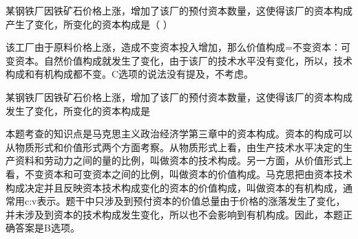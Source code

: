 \question 某钢铁厂因铁矿石价格上涨，增加了该厂的预付资本数量，这使得该厂的资本构成产生了变化，所变化的资本构成是（
）
\par{}
\begin{solution}该工厂由于原料价格上涨，造成不变资本投入增加，那么价值构成=不变资本：可变资本。自然价值构成就发生了变化，由于该厂的技术水平没有变化，所以，技术构成和有机构成都不变。C选项的说法没有提及，不考虑。
\end{solution}
\question 某钢铁厂因铁矿石价格上涨，增加了该厂的预付资本数量，这使得该厂的资本构成发生了变化，所变化的资本构成是
\par{}
\begin{solution}本题考查的知识点是马克思主义政治经济学第三章中的资本构成。资本的构成可以从物质形式和价值形式两个方面考察。从物质形式上看，由生产技术水平决定的生产资料和劳动力之间的量的比例，叫做资本的技术构成。另一方面，从价值形式上看，不变资本和可变资本之间的比例，叫做资本的价值构成。马克思把由资本技术构成决定并且反映资本技术构成变化的资本的价值构成，叫做资本的有机构成，通常用c:v表示。题干中只涉及到预付资本的价值总量由于价格的涨落发生了变化，并未涉及到资本的技术构成发生变化，所以也不会影响到有机构成。因此，本题正确答案是B选项。
\end{solution}

